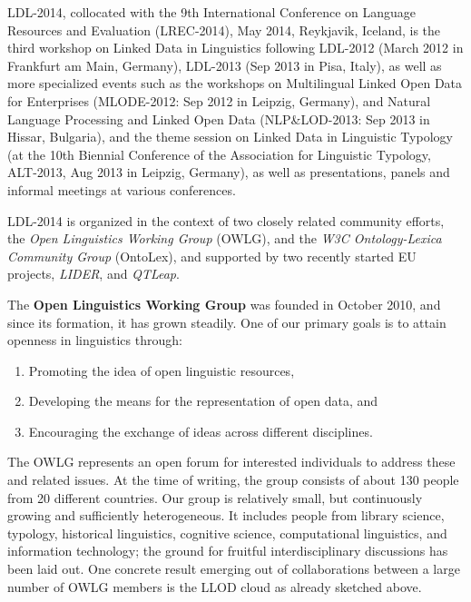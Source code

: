 LDL-2014, collocated with the 9th International Conference on Language Resources and Evaluation (LREC-2014), May 2014, Reykjavik, Iceland, is the third workshop on Linked Data in Linguistics following LDL-2012 (March 2012 in Frankfurt am Main, Germany), LDL-2013 (Sep 2013 in Pisa, Italy), as well as more specialized events such as the workshops on Multilingual Linked Open Data for Enterprises (MLODE-2012: Sep 2012 in Leipzig, Germany), and Natural Language Processing and Linked Open Data (NLP\&LOD-2013: Sep 2013 in Hissar, Bulgaria), and the theme session on Linked Data in Linguistic Typology (at the 10th Biennial Conference of the Association for Linguistic Typology, ALT-2013, Aug 2013 in Leipzig, Germany), as well as presentations, panels and informal meetings at various conferences.

LDL-2014 is organized in the context of two closely related community efforts, the \emph{Open Linguistics Working Group} (OWLG), and the \emph{W3C Ontology-Lexica Community Group} (OntoLex), and supported by two recently started EU projects, \emph{LIDER}, and \emph{QTLeap}.

The \textbf{Open Linguistics Working Group} was founded in October 2010, and since its formation, it has grown steadily. One of our primary goals is to attain openness in linguistics through:

\begin{enumerate}
\item Promoting the idea of open linguistic resources,
\item Developing the means for the representation of open data, and
\item Encouraging the exchange of ideas across different disciplines.
\end{enumerate}

The OWLG represents an open forum for interested individuals to address these and related issues.
At the time of writing, the group consists of about 130 	%
people from 20 												%
different countries.
Our group is relatively small, but continuously growing and sufficiently heterogeneous. 
It includes
people from library science, typology, historical linguistics, cognitive science, computational linguistics, and information technology; the ground for fruitful interdisciplinary discussions has been laid out.
One concrete result emerging out of collaborations between a large number of OWLG members is the LLOD cloud as already sketched above.


